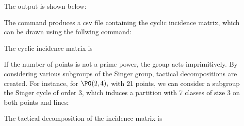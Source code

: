 
The output is shown below:

\bigskip

The command produces a csv file containing 
the cyclic incidence matrix, which can be 
drawn using the follwing command:


The cyclic incidence matrix is 


\bigskip



If the number of points is not a prime power, 
the group acts imprimitively.
By considering various subgroups of the Singer group, 
tactical decompositions are created.
For instance, for $\PG(2,4),$ with 21 points, 
we can consider a subgroup the Singer cycle of order 3, which induces a 
partition with 7 classes of size 3 on both points and lines:


The tactical decomposition of the incidence matrix is 


\bigskip


